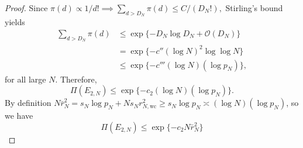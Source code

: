 \documentclass[11pt]{article}
\theoremstyle{plain}
\theoremstyle{definition}
\theoremstyle{plain}
\begin{document}
\begin{proof}
Since $\pi(d) \propto 1/d! \implies \sum_{d > D_N} \pi(d) \le C/(D_N !),$ Stirling's bound yields
\begin{equation*}
    \begin{split}
        \sum_{d > D_N} \pi(d) & \le \exp\{-D_N \log D_N + \mathcal{O}(D_N)\} \\
        & = \exp\{-c''(\log N)^2 \log \log N\} \\
        & \le \exp\{-c'''(\log N)(\log p_N)\},
    \end{split}
\end{equation*}
for all large $N$. Therefore, \[
\Pi(E_{2,N}) \le \exp\{-c_2 (\log N)(\log p_N)\}.
\]
By definition $N \bar{r}_N ^2 = s_N \log p_N + N s_N r_{N,\textrm{wc}}^2 \ge s_N \log p_N \asymp (\log N)(\log p_N)$, so we have \begin{equation}\label{eq:E2N-final}
\Pi(E_{2,N}) \le \exp\{-c_2 N \bar{r}_N ^2\}    
\end{equation}


\end{proof}
\end{document}

